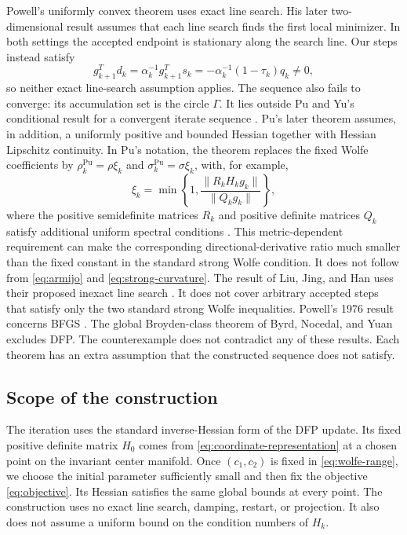 \documentclass[11pt]{article}
\begin{document}
Powell's uniformly convex theorem \cite{Powell1971} uses exact line search.
His later two-dimensional result \cite{Powell2000} assumes that each line
search finds the first local minimizer.  In both settings the accepted
endpoint is stationary along the search line.  Our steps instead satisfy
\[
g_{k+1}^Td_k=\alpha_k^{-1}g_{k+1}^Ts_k
=-\alpha_k^{-1}(1-\tau_k)q_k\ne0,
\]
so neither exact line-search assumption applies.  The sequence also fails to
converge: its accumulation set is the circle $\Gamma$.  It lies outside
Pu and Yu's conditional result for a convergent iterate sequence
\cite{PuYu1990}.  Pu's later theorem assumes, in addition, a uniformly
positive and bounded Hessian together with Hessian Lipschitz continuity.  In
Pu's notation, the theorem replaces the fixed Wolfe coefficients by
$\rho_k^{\mathrm{Pu}}=\rho\xi_k$ and
$\sigma_k^{\mathrm{Pu}}=\sigma\xi_k$, with, for example,
\[
\xi_k=\min\left\{1,
\frac{\|R_kH_kg_k\|}{\|Q_kg_k\|}\right\},
\]
where the positive semidefinite matrices $R_k$ and positive definite matrices
$Q_k$ satisfy additional uniform spectral conditions
\cite{Pu2002}.  This metric-dependent requirement can make the corresponding
directional-derivative ratio much smaller than the fixed constant in the
standard strong Wolfe condition.  It does not follow from
\eqref{eq:armijo} and \eqref{eq:strong-curvature}.  The result of Liu, Jing,
and Han uses their proposed inexact line search \cite{LiuJingHan2002}.  It
does not cover arbitrary accepted steps that satisfy only the two standard
strong Wolfe inequalities.  Powell's 1976 result concerns BFGS
\cite{Powell1976}.  The global Broyden-class theorem of Byrd, Nocedal, and
Yuan \cite{ByrdNocedalYuan1987} excludes DFP.  The counterexample does not
contradict any of these results.  Each theorem has an extra assumption that
the constructed sequence does not satisfy.

\subsection{Scope of the construction}

The iteration uses the standard inverse-Hessian form of the DFP update.  Its
fixed positive definite matrix $H_0$ comes from
\eqref{eq:coordinate-representation} at a chosen point on the invariant center
manifold.  Once $(c_1,c_2)$ is fixed in \eqref{eq:wolfe-range}, we choose the
initial parameter sufficiently small and then fix the objective
\eqref{eq:objective}.  Its Hessian satisfies the same global bounds at every
point.  The construction uses no exact line search, damping, restart, or
projection.  It also does not assume a uniform bound on the condition numbers
of $H_k$.
\end{document}
